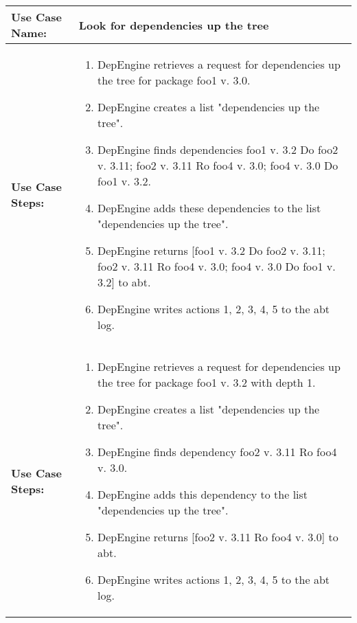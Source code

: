
\begin{tabularx}{\linewidth}{|l|X|}
\hline
\textbf{Use Case Name:} & \textbf{Look for dependencies up the tree} \\
\hline
\textbf{Use Case Steps:} & 
\begin{minipage}{\linewidth} 
 \vspace{0.05em}
  \begin{enumerate}
   \item DepEngine retrieves a request for dependencies up the tree for package foo1 v. 3.0.
   \item DepEngine creates a list "dependencies up the tree".
   \item DepEngine finds dependencies foo1 v. 3.2 Do foo2 v. 3.11;  foo2 v. 3.11 Ro foo4 v. 3.0; foo4 v. 3.0 Do foo1 v. 3.2.
   \item DepEngine adds these dependencies to the list "dependencies up the tree".
   \item DepEngine returns [foo1 v. 3.2 Do foo2 v. 3.11;  foo2 v. 3.11 Ro foo4 v. 3.0; foo4 v. 3.0 Do foo1 v. 3.2] to abt.
   \item DepEngine writes actions 1, 2, 3, 4, 5 to the abt log.
  \end{enumerate}
 \vspace{0.05em}
\end{minipage}
\\
\hline 
\textbf{Use Case Steps:} & 
\begin{minipage}{\linewidth} 
 \vspace{0.05em}
  \begin{enumerate}
   \item DepEngine retrieves a request for dependencies up the tree for package foo1 v. 3.2 with depth 1. 
   \item DepEngine creates a list "dependencies up the tree".
   \item DepEngine finds dependency foo2 v. 3.11 Ro foo4 v. 3.0.
   \item DepEngine adds this dependency to the list "dependencies up the tree".
   \item DepEngine returns [foo2 v. 3.11 Ro foo4 v. 3.0] to abt.
   \item DepEngine writes actions 1, 2, 3, 4, 5 to the abt log.
  \end{enumerate}
 \vspace{0.05em}
\end{minipage}
\\
\hline 
\end{tabularx}
